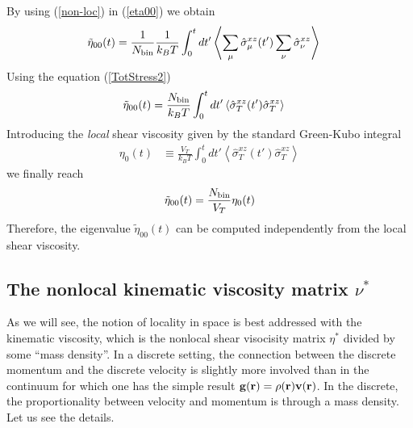 \documentclass[b5paper,openright,10pt]{book}
\newcommand{\llangle}{\left\langle}
\newcommand{\rrangle}{\right\rangle}
\begin{document}
By using (\ref{non-loc}) in (\ref{eta00}) we obtain
\begin{align}
    \tilde{\eta}_{00}(t)&=\frac{1}{N_{\rm bin}}\frac{1}{k_BT}\int_0^tdt'\llangle \sum_{\mu}\hat{\sigma}^{xz}_{\mu}(t')\sum_{\nu}\hat{\sigma}^{xz}_{\nu}\rrangle
\end{align}
Using the equation (\ref{TotStress2})
\begin{align}
    \tilde{\eta}_{00}(t)&=\frac{N_{\rm bin}}{k_BT}\int_0^tdt'\llangle \hat{\sigma}^{xz}_T(t')\hat{\sigma}^{xz}_T\rrangle
\end{align}
Introducing the \textit{local}  shear viscosity given by the standard Green-Kubo
integral
\begin{align}
  \eta_0(t) &\equiv \frac{V_T}{k_BT}\int_0^t dt'\llangle \hat{\sigma}_T^{xz}(t')\hat{\sigma}_T^{xz}
\rrangle
\label{etat}
\end{align}
we finally reach 
\begin{align}
    \tilde{\eta}_{00}(t)=\frac{N_{\rm bin}}{V_T}\eta_0(t)
\end{align}
Therefore, the eigenvalue $\tilde{\eta}_{00}(t)$ can be computed independently from
the local shear viscosity.

\subsection{The nonlocal kinematic viscosity matrix $\nu^*$}
As we will see, the notion of locality in space
is best addressed with the kinematic  viscosity, which is the nonlocal shear visocisity matrix $\eta^*$ divided by some ``mass density''. In  a discrete setting, the connection between
the  discrete momentum  and  the discrete  velocity  is slightly  more
involved than  in the continuum  for which  one has the  simple result
${\bf g}({\bf  r})=\rho({\bf r}){\bf  v}({\bf r})$.  In  the discrete,
the proportionality  between velocity and  momentum is through  a mass
density.  Let us see the details.
\end{document}
